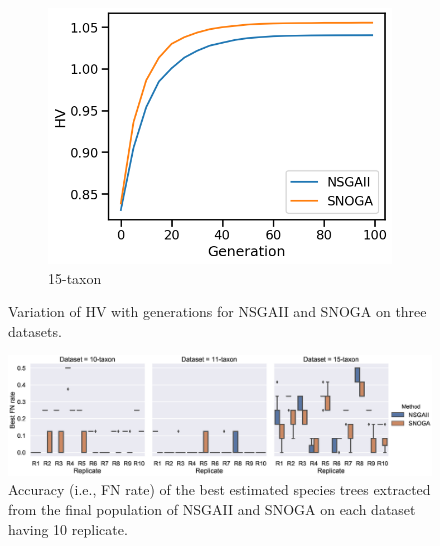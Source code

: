 \begin{figure}[!htbp]
\begin{subfigure}[b]{0.33\textwidth}
			\includegraphics[width=\textwidth]{Figure/15-taxon_hv}
			\caption{15-taxon}
\end{subfigure}
		\caption{Variation of HV with generations for NSGAII and SNOGA on three datasets.}
		\label{fig:gen_wise_hv}
\end{figure}

\begin{figure} [!htbp]
	\centering
\includegraphics[width=1\textwidth]{Figure/emo_boxplot}
\caption{Accuracy (i.e., FN rate) of the best estimated species trees extracted from the final population of NSGAII and SNOGA on each dataset having 10 replicate.} \label{fig:emo_compare}	
\end{figure}


